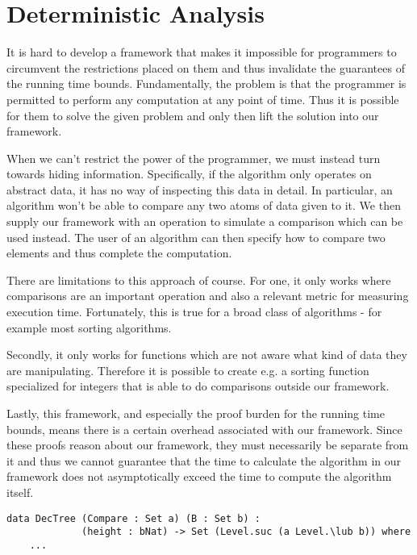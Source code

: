 
\chapter{Deterministic Analysis}
It is hard to develop a framework that makes it impossible for programmers to circumvent the restrictions placed on them and thus invalidate the guarantees of the running time bounds. Fundamentally, the problem is that the programmer is permitted to perform any computation at any point of time. Thus it is possible for them to solve the given problem and only then lift the solution into our framework.

When we can't restrict the power of the programmer, we must instead turn towards hiding information. Specifically, if the algorithm only operates on abstract data, it has no way of inspecting this data in detail. In particular, an algorithm won't be able to compare any two atoms of data given to it. We then supply our framework with an operation to simulate a comparison which can be used instead. The user of an algorithm can then specify how to compare two elements and thus complete the computation.

There are limitations to this approach of course. For one, it only works where comparisons are an important operation and also a relevant metric for measuring execution time. Fortunately, this is true for a broad class of algorithms - for example most sorting algorithms.

Secondly, it only works for functions which are not aware what kind of data they are manipulating. Therefore it is possible to create e.g. a sorting function specialized for integers that is able to do comparisons outside our framework.

Lastly, this framework, and especially the proof burden for the running time bounds, means there is a certain overhead associated with our framework. Since these proofs reason about our framework, they must necessarily be separate from it and thus we cannot guarantee that the time to calculate the algorithm in our framework does not asymptotically exceed the time to compute the algorithm itself.


\begin{lstlisting}[caption={The DecTree Monad},label={lst:dectree:1},emph={DecTree,Set,Level}]
data DecTree (Compare : Set a) (B : Set b) :
             (height : bNat) -> Set (Level.suc (a Level.\lub b)) where
    ...
\end{lstlisting}

